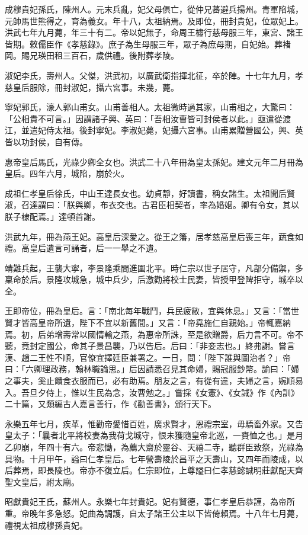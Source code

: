 成穆貴妃孫氏，陳州人。元末兵亂，妃父母俱亡，從仲兄蕃避兵揚州。青軍陷城，元帥馬世熊得之，育為義女。年十八，太祖納焉。及即位，冊封貴妃，位眾妃上。洪武七年九月薨，年三十有二。帝以妃無子，命周王橚行慈母服三年，東宮、諸王皆期。敕儒臣作《孝慈錄》。庶子為生母服三年，眾子為庶母期，自妃始。葬褚岡。賜兄瑛田租三百石，歲供禮。後附葬孝陵。

淑妃李氏，壽州人。父傑，洪武初，以廣武衛指揮北征，卒於陣。十七年九月，孝慈皇后服除，冊封淑妃，攝六宮事。未幾，薨。

寧妃郭氏，濠人郭山甫女。山甫善相人。太祖微時過其家，山甫相之，大驚曰：「公相貴不可言。」因謂諸子興、英曰：「吾相汝曹皆可封侯者以此。」亟遣從渡江，並遣妃侍太祖。後封寧妃。李淑妃薨，妃攝六宮事。山甫累贈營國公，興、英皆以功封侯，自有傳。

惠帝皇后馬氏，光祿少卿全女也。洪武二十八年冊為皇太孫妃。建文元年二月冊為皇后。四年六月，城陷，崩於火。

成祖仁孝皇后徐氏，中山王達長女也。幼貞靜，好讀書，稱女諸生。太祖聞后賢淑，召達謂曰：「朕與卿，布衣交也。古君臣相契者，率為婚姻。卿有令女，其以朕子棣配焉。」達頓首謝。

洪武九年，冊為燕王妃。高皇后深愛之。從王之籓，居孝慈高皇后喪三年，蔬食如禮。高皇后遺言可誦者，后一一舉之不遺。

靖難兵起，王襲大寧，李景隆乘間進圍北平。時仁宗以世子居守，凡部分備禦，多稟命於后。景隆攻城急，城中兵少，后激勸將校士民妻，皆授甲登陴拒守，城卒以全。

王即帝位，冊為皇后。言：「南北每年戰鬥，兵民疲敝，宜與休息。」又言：「當世賢才皆高皇帝所遺，陛下不宜以新舊間。」又言：「帝堯施仁自親始。」帝輒嘉納焉。初，后弟增壽常以國情輸之燕，為惠帝所誅，至是欲贈爵，后力言不可。帝不聽，竟封定國公，命其子景昌襲，乃以告后。后曰：「非妾志也。」終弗謝。嘗言漢、趙二王性不順，官僚宜擇廷臣兼署之。一日，問：「陛下誰與圖治者？」帝曰：「六卿理政務，翰林職論思。」后因請悉召見其命婦，賜冠服鈔幣。諭曰：「婦之事夫，奚止饋食衣服而已，必有助焉。朋友之言，有從有違，夫婦之言，婉順易入。吾旦夕侍上，惟以生民為念，汝曹勉之。」嘗採《女憲》、《女誡》作《內訓》二十篇，又類編古人嘉言善行，作《勸善書》，頒行天下。

永樂五年七月，疾革，惟勸帝愛惜百姓，廣求賢才，恩禮宗室，毋驕畜外家。又告皇太子：「曩者北平將校妻為我荷戈城守，恨未獲隨皇帝北巡，一賚恤之也。」是月乙卯崩，年四十有六。帝悲慟，為薦大齋於靈谷、天禧二寺，聽群臣致祭，光祿為具物。十月甲午，謚曰仁孝皇后。七年營壽陵於昌平之天壽山，又四年而陵成，以后葬焉，即長陵也。帝亦不復立后。仁宗即位，上尊謚曰仁孝慈懿誠明莊獻配天齊聖文皇后，祔太廟。

昭獻貴妃王氏，蘇州人。永樂七年封貴妃。妃有賢德，事仁孝皇后恭謹，為帝所重。帝晚年多急怒。妃曲為調護，自太子諸王公主以下皆倚賴焉。十八年七月薨，禮視太祖成穆孫貴妃。

